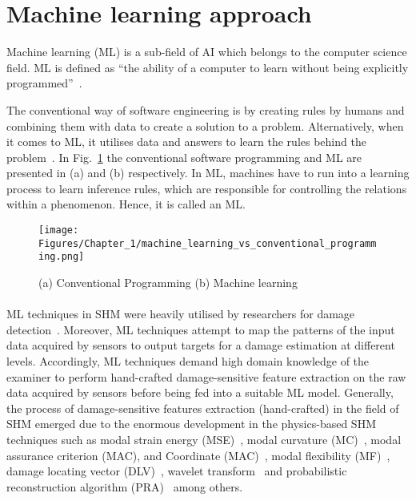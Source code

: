 \section{Machine learning approach}
\label{sec31}
Machine learning (ML) is a sub-field of AI which belongs to the computer science field. 
ML is defined as \enquote{the ability of a computer to learn without being explicitly programmed}~\cite{munoz2014machine}.

The conventional way of software engineering is by creating rules by humans and combining them with data to create a solution to a problem.
Alternatively, when it comes to ML, it utilises data and answers to learn the rules behind the problem~\cite{franoischollet2017learning}.
In Fig.~\ref{fig:Machine_learning} the conventional software programming and ML are presented in (a) and (b) respectively.
In ML, machines have to run into a learning process to learn inference rules, which are responsible for controlling the relations within a phenomenon. Hence, it is called an ML.
\begin{figure} [!ht]
	\begin{center}
		\centering
		\texttt{[image: Figures/Chapter\_1/machine\_learning\_vs\_conventional\_programming.png]}
	\end{center}
	\caption{(a) Conventional Programming	(b) Machine learning} 
	\label{fig:Machine_learning}
\end{figure}
\paragraph{}
ML techniques in SHM were heavily utilised by researchers for damage detection~\cite{raghavan2008effects, Su2009, Mitra2016}.
Moreover, ML techniques attempt to map the patterns of the input data acquired by sensors to output targets for a damage estimation at different levels. 
Accordingly, ML techniques demand high domain knowledge of the examiner to perform hand-crafted damage-sensitive feature extraction on the raw data acquired by sensors before being fed into a suitable ML model.
Generally, the process of damage-sensitive features extraction (hand-crafted) in the field of SHM emerged due to the enormous development in the physics-based SHM techniques such as modal strain energy (MSE)~\cite{Kim}, modal curvature (MC)~\cite{Wahab}, modal assurance criterion (MAC), and Coordinate (MAC)~\cite{Allemang2003}, modal flexibility (MF)~\cite{Jaishi}, damage locating vector (DLV)~\cite{Bernal2002}, wavelet transform~\cite{Staszewski,Kima} and probabilistic reconstruction algorithm (PRA)~\cite{Hay2006} among others.

